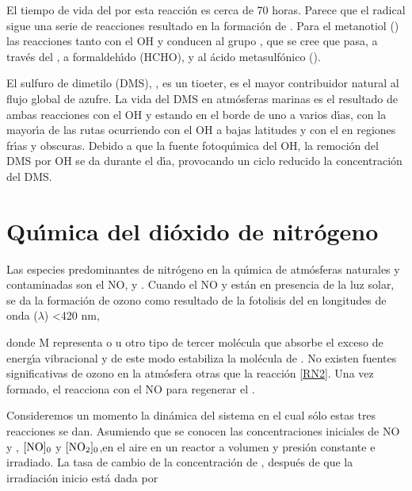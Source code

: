 
El tiempo de vida del  por esta reacci\'on es cerca de 70 horas. Parece que el radical  sigue una serie de reacciones resultado en la formaci\'on de  . Para el metanotiol () las reacciones tanto con el OH y  conducen al grupo , que se cree que pasa, a trav\'es del , a formaldeh\'{\i}do (HCHO),   y al \'acido metasulf\'onico ().

El sulfuro de dimetilo (DMS), , es un \gls{tioeter}, es el mayor contribuidor natural al flujo global de azufre. La vida del DMS en atm\'osferas marinas es el resultado de ambas reacciones con el OH y  estando en el borde de uno a varios d\'{\i}as, con la mayor\'{\i}a de las rutas ocurriendo con el OH a bajas latitudes y con el  en regiones fr\'{\i}as  y obscuras. Debido a que la fuente fotoqu\'{\i}mica del OH, la remoci\'on del DMS por OH se da durante el d\'{\i}a, provocando un ciclo reducido la concentraci\'on del DMS.


\section{Qu\'{\i}mica del di\'oxido de nitr\'ogeno}\label{qno2}
Las especies predominantes de nitr\'ogeno en la qu\'{\i}mica de atm\'osferas naturales y contaminadas son el NO,  y . 
Cuando el NO y   est\'an en presencia de la luz solar, se da la formaci\'on de ozono como resultado de la fotolisis del   en longitudes de onda ($\lambda$) <420 nm,



donde M representa  o  u otro tipo de tercer mol\'ecula que absorbe el exceso de energ\'{\i}a vibracional y de este modo estabiliza la mol\'ecula de . No existen fuentes significativas de ozono en la atm\'osfera otras que la reacci\'on \ref{RN2}. Una vez formado, el  reacciona con el NO para regenerar el .


Consideremos un momento la din\'amica del sistema en el cual s\'olo estas tres reacciones se dan. Asumiendo que se conocen las concentraciones iniciales de NO y , $[\ce{NO}]_0$ y $[\ce{NO2}]_0$,en el aire en un reactor a volumen y presi\'on constante e irradiado. La tasa de cambio de la concentraci\'on de , despu\'es de que la irradiaci\'on inicio est\'a dada por

